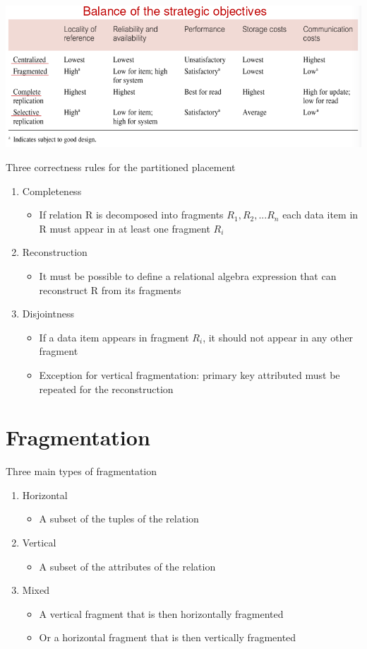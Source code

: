 \documentclass{article}[18pt]
\begin{document}
\begin{center}
	\includegraphics[scale=0.7]{Strategies}
\end{center}
Three correctness rules for the partitioned placement
\begin{enumerate}
	\item Completeness
	\begin{itemize}
		\item If relation R is decomposed into fragments $R_1,R_2,...R_n$ each data item in R must appear in at least one fragment $R_i$
	\end{itemize}
	\item Reconstruction
	\begin{itemize}
		\item It must be possible to define a relational algebra expression that can reconstruct R from its fragments
	\end{itemize}
	\item Disjointness
	\begin{itemize}
		\item If a data item appears in fragment $R_i$, it should not appear in any other fragment
		\item Exception for vertical fragmentation: primary key attributed must be repeated for the reconstruction
	\end{itemize}
\end{enumerate}
\section{Fragmentation}
Three main types of fragmentation
\begin{enumerate}
	\item Horizontal
	\begin{itemize}
		\item A subset of the tuples of the relation
	\end{itemize}
	\item Vertical
	\begin{itemize}
		\item A subset of the attributes of the relation
	\end{itemize}
	\item Mixed
	\begin{itemize}
		\item A vertical fragment that is then horizontally fragmented
		\item Or a horizontal fragment that is then vertically fragmented
	\end{itemize}
\end{enumerate}
\end{document}
